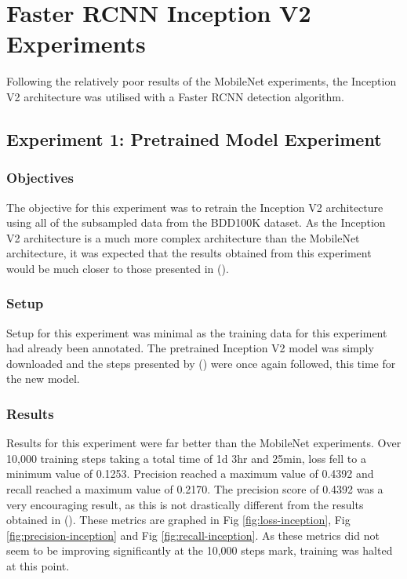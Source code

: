 \documentclass[12pt]{report}
\begin{document}
\newpage
\section{Faster RCNN Inception V2 Experiments}
\begin{flushleft}
Following the relatively poor results of the MobileNet experiments, the Inception V2 architecture was utilised with a Faster RCNN detection algorithm.
\end{flushleft}

\subsection{Experiment 1: Pretrained Model Experiment}
\subsubsection*{Objectives}
\begin{flushleft}
The objective for this experiment was to retrain the Inception V2 architecture using all of the subsampled data from the BDD100K dataset. As the Inception V2 architecture is a much more complex architecture than the MobileNet architecture, it was expected that the results obtained from this experiment would be much closer to those presented in (\cite{yu2018bdd100k}).
\end{flushleft}

\subsubsection*{Setup}
\begin{flushleft}
Setup for this experiment was minimal as the training data for this experiment had already been annotated. The pretrained Inception V2 model was simply downloaded and the steps presented by (\cite{tutorial}) were once again followed, this time for the new model.
\end{flushleft}

\subsubsection*{Results}
\begin{flushleft}
Results for this experiment were far better than the MobileNet experiments. Over 10,000 training steps taking a total time of 1d 3hr and 25min, loss fell to a minimum value of 0.1253. Precision reached a maximum value of 0.4392 and recall reached a maximum value of 0.2170. The precision score of 0.4392 was a very encouraging result, as this is not drastically different from the results obtained in (\cite{yu2018bdd100k}). These metrics are graphed in Fig \ref{fig:loss-inception}, Fig \ref{fig:precision-inception} and Fig \ref{fig:recall-inception}. As these metrics did not seem to be improving significantly at the 10,000 steps mark, training was halted at this point.
\end{flushleft}
\end{document}
